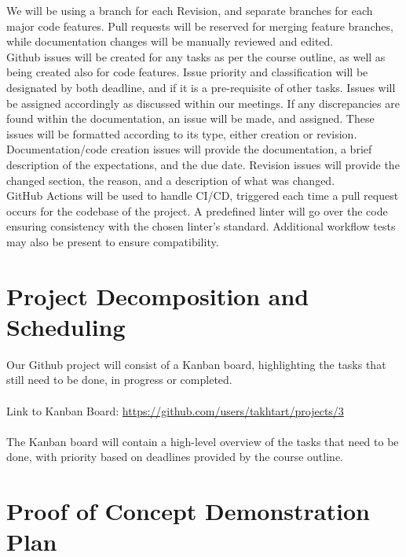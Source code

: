 \documentclass{article}
\begin{document}
We will be using a branch for each Revision, and separate branches for each
major code features. Pull requests will be reserved for merging feature branches,
while documentation changes will be manually reviewed and edited.\\

Github issues will be created for any tasks as per the course outline, as well as being created also for code features.
Issue priority and classification will be designated by both deadline, and if it is a pre-requisite of other tasks.
Issues will be assigned accordingly as discussed within our meetings. 
If any discrepancies are found within the documentation, an issue will be made, and assigned. 
These issues will be formatted according to its type, either creation or revision. Documentation/code creation issues will provide the documentation, a brief description of the expectations, and the due date. 
Revision issues will provide the changed section, the reason, and a description of what was changed.\\

GitHub Actions will be used to handle CI/CD, triggered each time a pull request occurs for the codebase of the project. 
A predefined linter will go over the code ensuring consistency with the chosen linter's standard. 
Additional workflow tests may also be present to ensure compatibility.


\section{Project Decomposition and Scheduling}

Our Github project will consist of a Kanban board, highlighting the tasks that still need to be done, in progress or completed.\\
\\
\noindent Link to Kanban Board:
\noindent\href{https://github.com/users/takhtart/projects/3}{https://github.com/users/takhtart/projects/3}\\
\\
The Kanban board will contain a high-level overview of the tasks that need to be done, 
with priority based on deadlines provided by the course outline.

\section{Proof of Concept Demonstration Plan}
\end{document}
